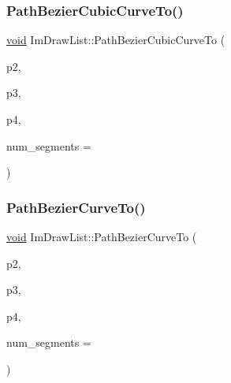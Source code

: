 \mbox{\label{structImDrawList_a48358bf6904dfd09906c6bfa3ef88777}} 
\subsubsection{\texorpdfstring{Path\+Bezier\+Cubic\+Curve\+To()}{PathBezierCubicCurveTo()}}
{\footnotesize\ttfamily \hyperlink{imgui__impl__opengl3__loader_8h_ac668e7cffd9e2e9cfee428b9b2f34fa7}{void} Im\+Draw\+List\+::\+Path\+Bezier\+Cubic\+Curve\+To (\begin{DoxyParamCaption}\item[{const \hyperlink{structImVec2}{Im\+Vec2} \&}]{p2,  }\item[{const \hyperlink{structImVec2}{Im\+Vec2} \&}]{p3,  }\item[{const \hyperlink{structImVec2}{Im\+Vec2} \&}]{p4,  }\item[{int}]{num\+\_\+segments = {} }\end{DoxyParamCaption})}

\mbox{\label{structImDrawList_a9a9dc4a62a26718014e9dc67f40a19e3}} 
\subsubsection{\texorpdfstring{Path\+Bezier\+Curve\+To()}{PathBezierCurveTo()}}
{\footnotesize\ttfamily \hyperlink{imgui__impl__opengl3__loader_8h_ac668e7cffd9e2e9cfee428b9b2f34fa7}{void} Im\+Draw\+List\+::\+Path\+Bezier\+Curve\+To (\begin{DoxyParamCaption}\item[{const \hyperlink{structImVec2}{Im\+Vec2} \&}]{p2,  }\item[{const \hyperlink{structImVec2}{Im\+Vec2} \&}]{p3,  }\item[{const \hyperlink{structImVec2}{Im\+Vec2} \&}]{p4,  }\item[{int}]{num\+\_\+segments = {} }\end{DoxyParamCaption})\hspace{0.3cm}{\ttfamily [inline]}}

